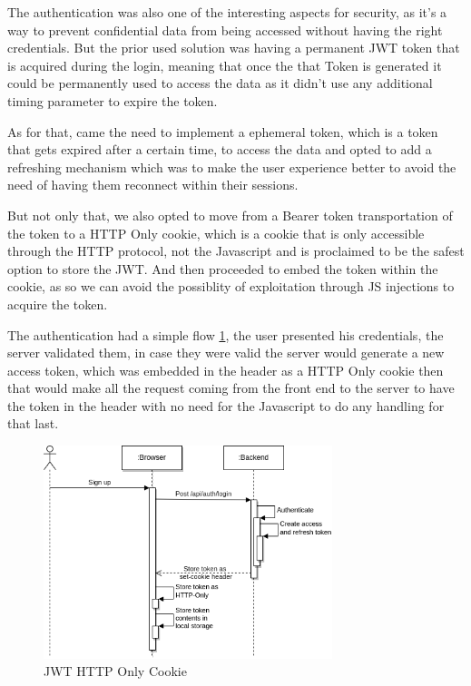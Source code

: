 The authentication was also one of the interesting aspects for security, as it's a way to
prevent confidential data from being accessed without having the right credentials. But the 
prior used solution was having a permanent JWT token that is acquired during the login, meaning 
that once the that Token is generated it could be permanently used to access the data as it didn't
use any additional timing parameter to expire the token.

As for that, came the need to implement a ephemeral token, which is a token that gets expired after
a certain time, to access the data and opted to add a refreshing mechanism which was to make the
user experience better to avoid the need of having them reconnect within their sessions.

But not only that, we also opted to move from a Bearer token transportation of the token to a HTTP Only cookie,
which is a cookie that is only accessible through the HTTP protocol, not the Javascript and is proclaimed to
be the safest option to store the JWT. And then proceeded to embed the token within the cookie,
as so we can avoid the possiblity of exploitation through JS injections to acquire the token.

The authentication had a simple flow \ref{fig:token}, the user presented his credentials,
the server validated them, in case they were valid the server would generate a new access 
token, which was embedded in the header as a HTTP Only cookie then that would make 
all the request coming from the front end to the server to have the token in the header
with no need for the Javascript to do any handling for that last.

\begin{figure}[!htbp]
    \centering
    \includegraphics[width=0.75\textwidth]{images/JWTHttpOnly.png}
    \caption{\footnotesize{JWT HTTP Only Cookie}}
    \label{fig:token}
\end{figure}

